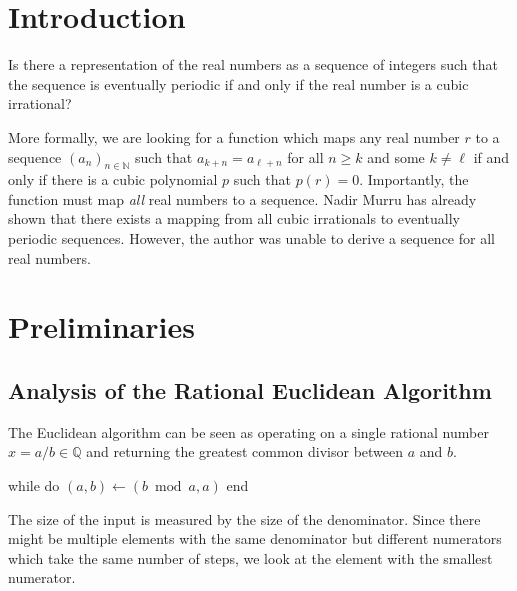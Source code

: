 \documentclass[english,version-2020-11]{uzl-thesis}
\newcommand\N{{\mathbb N}}
\newcommand\Q{{\mathbb Q}}
\begin{document}

\chapter{Introduction}


\begin{problem}
  Is there a representation of the real numbers as a sequence of integers such
  that the sequence is eventually periodic if and only if the real number is a
  cubic irrational?
\end{problem}

More formally, we are looking for a function which maps any real number $r$ to
a sequence $(a_n)_{n \in \N}$ such that $a_{k+n} = a_{\ell+n}$ for all $n \ge k$ and
some $k \ne \ell$ if and only if there is a cubic polynomial $p$ such that $p(r) = 0$.
Importantly, the function must map \emph{all} real numbers to a sequence.
Nadir Murru \cite{Murru15} has already shown that there exists a mapping from all
cubic irrationals to eventually periodic sequences.
However, the author was unable to derive a sequence for all real numbers.


\chapter{Preliminaries}


\section{Analysis of the Rational Euclidean Algorithm}

The Euclidean algorithm can be seen as operating on a single rational number $x
= a/b \in \Q$ and returning the greatest common divisor between $a$ and $b$.

\begin{Pseudocode}
while  do
  $(a, b) \gets (b \bmod a, a)$
end
\end{Pseudocode}

The size of the input is measured by the size of the denominator.
Since there might be multiple elements with the same denominator but different
numerators which take the same number of steps, we look at the element
with the smallest numerator.
\end{document}
